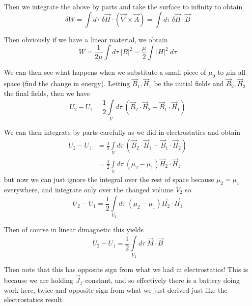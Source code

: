 \documentclass[10pt]{report}
\newcommand{\abs}[1]{\left|#1\right|}
\begin{document}
Then we integrate the above by parts and take the surface to infinity  to obtain
\begin{equation}
    \delta W = \int d\tau\; \delta \vec{H} \cdot \left( \vec{\nabla} \times \vec{A} \right) = \int d\tau\; \delta \vec{H} \cdot \vec{B}
\end{equation}

Then obviously if we have a linear material, we obtain
\begin{equation}
    W = \frac{1}{2\mu}\int d\tau\; \abs{B}^2 = \frac{\mu}{2}\int \abs{H}^2\; d\tau
\end{equation}

We can then see what happens when we substitute a small piece of $\mu_0$ to $\mu$in all space (find the change in energy). Letting $\vec{B}_1, \vec{H}_1$ be the initial fields and $\vec{B}_2, \vec{H}_2$ the final fields, then we have
\begin{equation}
    U_2 - U_1 = \frac{1}{2}\int\limits_{V}^{}d\tau\;\left( \vec{B}_2 \cdot \vec{H}_2 - \vec{B}_1 \cdot\vec{H}_1 \right)
\end{equation}

We can then integrate by parts carefully as we did in electrostatics and obtain
\begin{align}
    U_2 - U_1 &= \frac{1}{2}\int\limits_{V}^{}d\tau\;\left( \vec{B}_2 \cdot \vec{H}_1 - \vec{B}_1 \cdot \vec{H}_2 \right)\\
    &= \frac{1}{2}\int\limits_{V}^{}d\tau\;\left( \mu_2 - \mu_1 \right)\vec{H}_2 \cdot \vec{H}_1
\end{align}
but now we can just ignore the integral over the rest of space because $\mu_2 = \mu_1$ everywhere, and integrate only over the changed volume $V_2$ so
\begin{equation}
    U_2 - U_1 = \frac{1}{2}\int\limits_{V_2}^{}d\tau\;(\mu_2 - \mu_1)\vec{H}_2 \cdot \vec{H}_1
\end{equation}

Then of course in linear dimagnetic this yields
\begin{equation}
    U_2 - U_1 = \frac{1}{2}\int\limits_{V_2}^{}d\tau\;\vec{M} \cdot \vec{B}
\end{equation}

Then note that this has opposite sign from what we had in electrostatics! This is because we are holding $\vec{J}_f$ constant, and so effectively there is a battery doing work here, twice and opposite sign from what we just derived just like the electrostatics result. 
\end{document}
